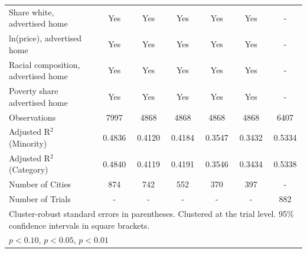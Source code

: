 \begin{table}[htbp]
{\begin{tabular}{l*{6}{c}}
\midrule
Share white, advertised home  & Yes & Yes & Yes & Yes & Yes & - \\
ln(price), advertised home  & Yes & Yes & Yes & Yes & Yes & - \\
Racial composition, advertised home & Yes & Yes & Yes & Yes & Yes & - \\
Poverty share advertised home & Yes & Yes & Yes & Yes & Yes & - \\
Observations & 7997 & 4868 & 4868 & 4868 & 4868 & 6407 \\
Adjusted R$^2$ (Minority) & 0.4836 & 0.4120 & 0.4184 & 0.3547 & 0.3432 & 0.5334 \\
Adjusted R$^2$ (Category) & 0.4840 & 0.4119 & 0.4191 & 0.3546 & 0.3434 & 0.5338 \\
Number of Cities & 874 & 742 & 552 & 370 & 397 & - \\
Number of Trials & - & - & - & - & - & 882 \\
\bottomrule
\multicolumn{7}{l}{\footnotesize Cluster-robust standard errors in parentheses. Clustered at the trial level. 95\% confidence intervals in square brackets.}\\
\multicolumn{7}{l}{\footnotesize \sym{*} \(p<0.10\), \sym{**} \(p<0.05\), \sym{***} \(p<0.01\)}\\
\end{tabular}
}
\end{table}

